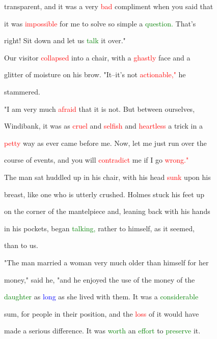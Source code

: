  transparent, and it was a very \textcolor{red}{bad} \textcolor{BurntOrange}{compliment} when you said that

 it was \textcolor{red}{impossible} for me to solve so simple a \textcolor{green}{question.} That's

 right! Sit down and let us \textcolor{green}{talk} it over."



 Our \textcolor{BurntOrange}{visitor} \textcolor{red}{collapsed} into a chair, with a \textcolor{red}{ghastly} face and a

 \textcolor{BurntOrange}{glitter} of moisture on his brow. "It--it's not \textcolor{red}{actionable,"} he

 stammered.



 "I am very much \textcolor{red}{afraid} that it is not. But between ourselves,

 Windibank, it was as \textcolor{red}{cruel} and \textcolor{red}{selfish} and \textcolor{red}{heartless} a \textcolor{BurntOrange}{trick} in a

 \textcolor{red}{petty} way as ever came before me. Now, let me just run over the

 course of events, and you will \textcolor{red}{contradict} me if I go \textcolor{red}{wrong."}



 The man sat huddled up in his chair, with his head \textcolor{red}{sunk} upon his

 breast, like one who is utterly crushed. Holmes stuck his feet up

 on the corner of the mantelpiece and, leaning back with his hands

 in his pockets, began \textcolor{green}{talking,} rather to himself, as it seemed,

 than to us.



 "The man married a woman very much older than himself for her

 \textcolor{BurntOrange}{money,"} said he, "and he \textcolor{BurntOrange}{enjoyed} the use of the \textcolor{BurntOrange}{money} of the

 \textcolor{green}{daughter} as \textcolor{blue}{long} as she lived with them. It was a \textcolor{green}{considerable}

 sum, for people in their position, and the \textcolor{red}{loss} of it would have

 made a serious difference. It was \textcolor{green}{worth} an \textcolor{green}{effort} to \textcolor{green}{preserve} it.

